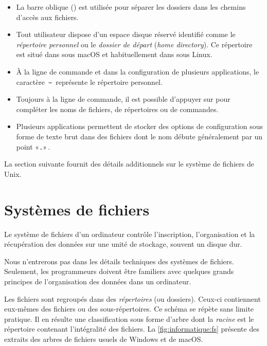 \begin{itemize}
\item La barre oblique (\code{/}) est utilisée pour séparer les
  dossiers dans les chemins d'accès aux fichiers.
\item Tout utilisateur dispose d'un espace disque réservé identifié
  comme le \emph{répertoire personnel} ou
  le \emph{dossier
    de départ} (\emph{home directory}). Ce répertoire est situé dans
   sous macOS et habituellement dans  sous
  Linux.
\item À la ligne de commande et dans la configuration de plusieurs
  applications, le caractère \,\verb=~=\, représente le répertoire
  personnel.
\item Toujours à la ligne de commande, il est possible d'appuyer sur
   pour compléter les noms de fichiers, de répertoires ou de
  commandes.
\item Plusieurs applications permettent de stocker des options de
  configuration sous forme de texte brut dans des fichiers dont le nom
  débute généralement par un point «\verb=.=»\,.
\end{itemize}
La section suivante fournit des détails additionnels sur le système de
fichiers de Unix.


\section{Systèmes de fichiers}
\label{sec:informatique:fs}

Le système de fichiers d'un ordinateur
contrôle l'inscription, l'organisation et la récupération des données
sur une unité de stockage, souvent un disque dur.

Nous n'entrerons pas dans les détails techniques des systèmes de
fichiers. Seulement, les programmeurs doivent être familiers avec
quelques grands principes de l'organisation des données dans un
ordinateur.

Les fichiers sont regroupés dans des
\emph{répertoires} (ou dossiers). Ceux-ci
contiennent eux-mêmes des fichiers ou des sous-répertoires. Ce schéma
se répète sans limite pratique. Il en résulte une classification sous
forme d'arbre dont la \emph{racine} est le répertoire contenant
l'intégralité des fichiers. La \autoref{fig:informatique:fs} présente
des extraits des arbres de fichiers usuels de Windows et de macOS.

